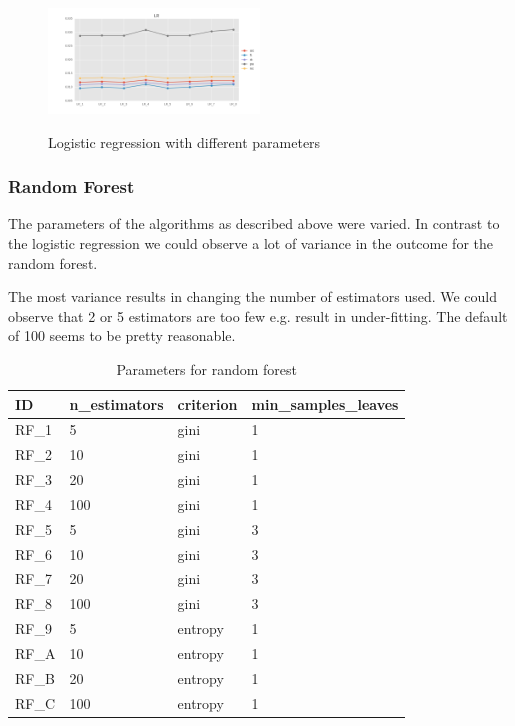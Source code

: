 \documentclass{sig-alternate-05-2015}
\begin{document}
\begin{figure}[h]
  \centering
  \caption{Logistic regression with different parameters}
  \includegraphics[width=0.5\textwidth]{../plots/LR_compare_param}
  \label{fig:lr}
\end{figure}

\subsubsection{Random Forest}
The parameters of the algorithms as described above were varied.
In contrast to the logistic regression we could observe a lot of variance in the outcome for the random forest.

The most variance results in changing the number of estimators used. We could observe that 2 or 5 estimators are too few e.g. result in under-fitting. The default of 100 seems to be pretty reasonable.

\begin{table}[h]
\centering
\caption{Parameters for random forest}
\label{rf-table}
\begin{tabular}{|l|l|l|l|}
\hline
ID & n\_estimators & criterion & min\_samples\_leaves \\ \hline
RF\_1                    & 5             & gini      & 1                    \\ \hline
RF\_2                    & 10            & gini      & 1                    \\ \hline
RF\_3                    & 20            & gini      & 1                    \\ \hline
RF\_4                    & 100            & gini      & 1                    \\ \hline
RF\_5                    & 5             & gini      & 3                    \\ \hline
RF\_6                    & 10            & gini      & 3                    \\ \hline
RF\_7                    & 20            & gini      & 3                    \\ \hline
RF\_8                    & 100            & gini      & 3                    \\ \hline
RF\_9                    & 5             & entropy      & 1                    \\ \hline
RF\_A                    & 10            & entropy      & 1                    \\ \hline
RF\_B                    & 20            & entropy      & 1                    \\ \hline
RF\_C                    & 100            & entropy      & 1                    
\\ \hline
\end{tabular}
\end{table}
\end{document}

